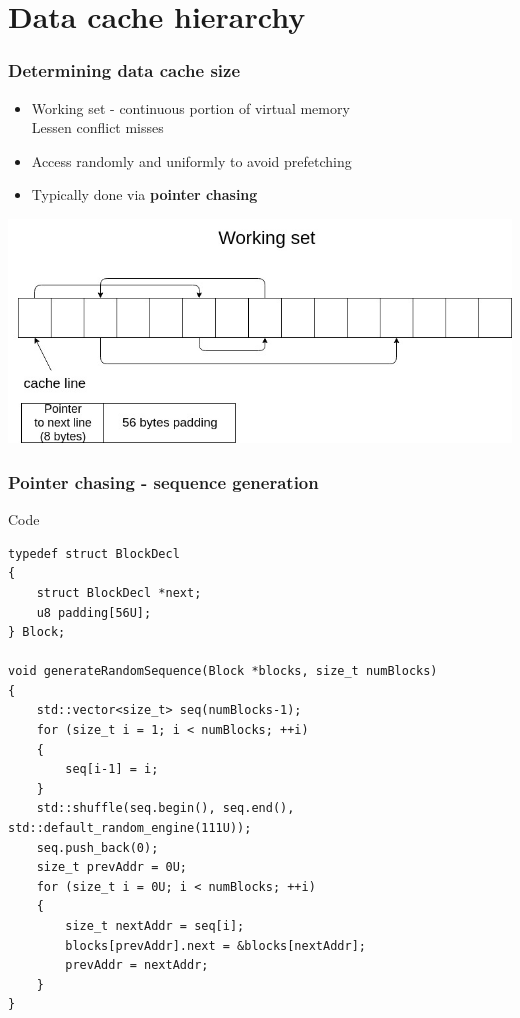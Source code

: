 \documentclass{beamer}
\begin{document}
\section{Data cache hierarchy}

\begin{frame}
\frametitle{Determining data cache size}
\begin{itemize}
\item Working set - continuous portion of virtual memory\\
      Lessen conflict misses
\item Access randomly and uniformly to avoid prefetching
\item Typically done via \textbf{pointer chasing}
\end{itemize}
\centerline{\includegraphics[scale=.3]{img/pchase.jpg}}
\end{frame}

\begin{frame}[fragile]
\frametitle{Pointer chasing - sequence generation}
\begin{block}{Code}
\begin{lstlisting}[style=code]
typedef struct BlockDecl
{
    struct BlockDecl *next;
    u8 padding[56U];
} Block;

void generateRandomSequence(Block *blocks, size_t numBlocks)
{
    std::vector<size_t> seq(numBlocks-1);
    for (size_t i = 1; i < numBlocks; ++i)
    {   
        seq[i-1] = i;
    }   
    std::shuffle(seq.begin(), seq.end(), std::default_random_engine(111U));
    seq.push_back(0);
    size_t prevAddr = 0U; 
    for (size_t i = 0U; i < numBlocks; ++i)
    {   
        size_t nextAddr = seq[i];
        blocks[prevAddr].next = &blocks[nextAddr];
        prevAddr = nextAddr;
    }   
}
\end{lstlisting}
\end{block}
\end{frame}
\end{document}
